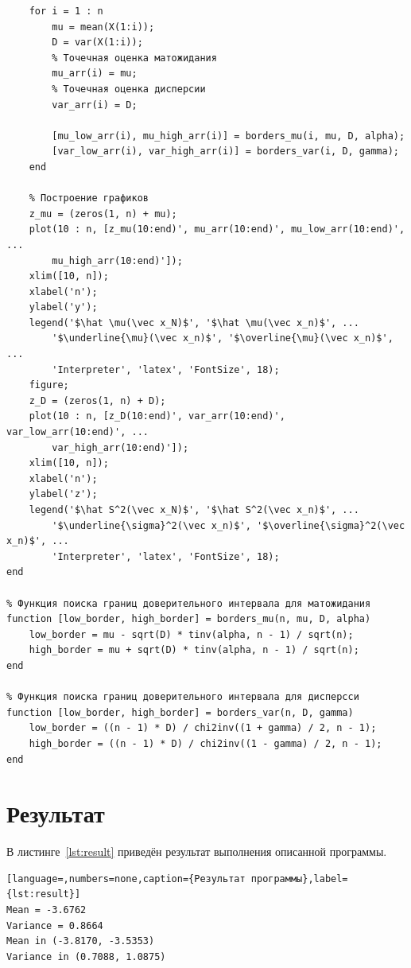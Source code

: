 \begin{lstlisting}[caption={Текст программы},label={lst:programm}]
    % Заполнение созданных массивов
    for i = 1 : n
        mu = mean(X(1:i));
        D = var(X(1:i));
        % Точечная оценка матожидания
        mu_arr(i) = mu;
        % Точечная оценка дисперсии
        var_arr(i) = D;

        [mu_low_arr(i), mu_high_arr(i)] = borders_mu(i, mu, D, alpha);
        [var_low_arr(i), var_high_arr(i)] = borders_var(i, D, gamma);
    end
    
    % Построение графиков
    z_mu = (zeros(1, n) + mu);
    plot(10 : n, [z_mu(10:end)', mu_arr(10:end)', mu_low_arr(10:end)', ...
        mu_high_arr(10:end)']);
    xlim([10, n]);
    xlabel('n');
    ylabel('y');
    legend('$\hat \mu(\vec x_N)$', '$\hat \mu(\vec x_n)$', ...
        '$\underline{\mu}(\vec x_n)$', '$\overline{\mu}(\vec x_n)$', ...
        'Interpreter', 'latex', 'FontSize', 18);
    figure;
    z_D = (zeros(1, n) + D);
    plot(10 : n, [z_D(10:end)', var_arr(10:end)', var_low_arr(10:end)', ...
        var_high_arr(10:end)']);
    xlim([10, n]);
    xlabel('n');
    ylabel('z');
    legend('$\hat S^2(\vec x_N)$', '$\hat S^2(\vec x_n)$', ...
        '$\underline{\sigma}^2(\vec x_n)$', '$\overline{\sigma}^2(\vec x_n)$', ...
        'Interpreter', 'latex', 'FontSize', 18);
end

% Функция поиска границ доверительного интервала для матожидания
function [low_border, high_border] = borders_mu(n, mu, D, alpha)
    low_border = mu - sqrt(D) * tinv(alpha, n - 1) / sqrt(n);
    high_border = mu + sqrt(D) * tinv(alpha, n - 1) / sqrt(n);
end

% Функция поиска границ доверительного интервала для дисперсси
function [low_border, high_border] = borders_var(n, D, gamma)
    low_border = ((n - 1) * D) / chi2inv((1 + gamma) / 2, n - 1);
    high_border = ((n - 1) * D) / chi2inv((1 - gamma) / 2, n - 1);
end
\end{lstlisting}

\section{Результат}

В листинге~\ref{lst:result} приведён результат выполнения описанной программы.
\begin{lstlisting}[language=,numbers=none,caption={Результат программы},label={lst:result}]
Mean = -3.6762
Variance = 0.8664
Mean in (-3.8170, -3.5353)
Variance in (0.7088, 1.0875)
\end{lstlisting}

